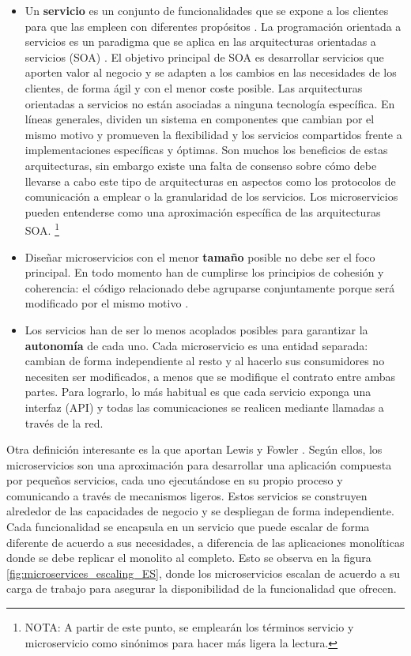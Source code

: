 \documentclass[11pt,spanish,listoffigures]{tfgetsinf}
\begin{document}
\begin{itemize}

\item Un \textbf{servicio} es un conjunto de funcionalidades que se expone a los clientes para que las empleen con diferentes propósitos \cite{Wikipedia}. La programación orientada a servicios es un paradigma que se aplica en las arquitecturas orientadas a servicios (SOA) \cite{Arsanjani2009a}. El objetivo principal de SOA es desarrollar servicios que aporten valor al negocio y se adapten a los cambios en las necesidades de los clientes, de forma ágil y con el menor coste posible. Las arquitecturas orientadas a servicios no están asociadas a ninguna tecnología específica. En líneas generales, dividen un sistema en componentes que cambian por el mismo motivo y promueven la flexibilidad y los servicios compartidos frente a implementaciones específicas y óptimas. Son muchos los beneficios de estas arquitecturas, sin embargo existe una falta de consenso sobre cómo debe llevarse a cabo este tipo de arquitecturas en aspectos como los protocolos de comunicación a emplear o la granularidad de los servicios. Los microservicios pueden entenderse como una aproximación específica de las arquitecturas SOA. \footnote{ NOTA: A partir de este punto, se emplearán los términos servicio y microservicio como sinónimos para hacer más ligera la lectura.}

\item Diseñar microservicios con el menor \textbf{tamaño} posible no debe ser el foco principal. En todo momento han de cumplirse los principios de cohesión y coherencia: el código relacionado debe agruparse conjuntamente porque será modificado por el mismo motivo \cite{Newman2015a}.

\item  Los servicios han de ser lo menos acoplados posibles para garantizar la \textbf{autonomía} de cada uno. Cada microservicio es una entidad separada: cambian de forma independiente al resto y al hacerlo sus consumidores no necesiten ser modificados, a menos que se modifique el contrato entre ambas partes. Para lograrlo, lo más habitual es que cada servicio exponga una interfaz (API) y todas las comunicaciones se realicen mediante llamadas a través de la red\cite{Newman2015a, Hunter2017}.

\end{itemize}

Otra definición interesante es la que aportan Lewis y Fowler \cite{Lewis2014}. Según ellos, los microservicios son una aproximación para desarrollar una aplicación compuesta por pequeños servicios, cada uno ejecutándose en su propio proceso y comunicando a través de mecanismos ligeros. Estos servicios se construyen alrededor de las capacidades de negocio y se despliegan de forma independiente. Cada funcionalidad se encapsula en un servicio que puede escalar de forma diferente de acuerdo a sus necesidades, a diferencia de las aplicaciones monolíticas donde se debe replicar el monolito al completo. Esto se observa en la figura \ref{fig:microservices_escaling_ES}, donde los microservicios escalan de acuerdo a su carga de trabajo para asegurar la disponibilidad de la funcionalidad que ofrecen.
\end{document}
